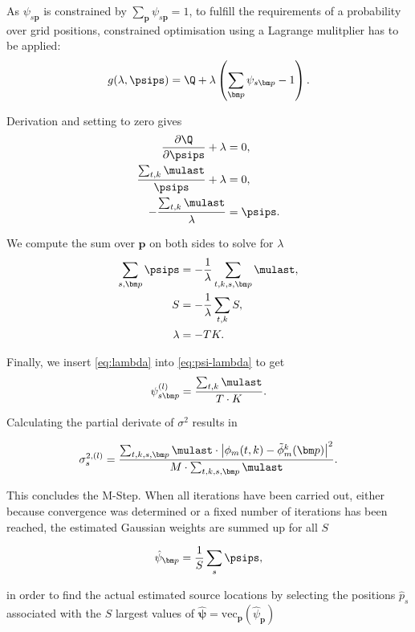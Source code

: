 As $\psi_{s\bm p}$ is constrained by $\sum_{\bm p}\psi_{s\bm p}=1$, to fulfill the requirements of a probability over grid positions, constrained optimisation using a Lagrange mulitplier has to be applied:
\begin{equation}
    g(\lambda,\psips)=\Q+\lambda\left (\sum_{\bm p}\psi_{s\bm p}-1\right ).
\end{equation}

Derivation and setting to zero gives
\begin{align}
    \frac{\partial\Q}{\partial\psips}+\lambda &=0,\\
    \frac{\sum_{t,k}\mulast}{\psips}+\lambda &=0,\\
    -\frac{\sum_{t,k}\mulast}{\lambda}&=\psips
\label{eq:psi-lambda}.
\end{align}

We compute the sum over $\bm p$ on both sides to solve for $\lambda$
\begin{align}
    \sum_{s,\bm p}\psips &=-\frac{1}{\lambda}\sum_{t,k,s,\bm p}\mulast,\\
    S&=-\frac{1}{\lambda}\sum_{t,k}S,\\
    \lambda &= -TK.\label{eq:lambda}
\end{align}

Finally, we insert \eqref{eq:lambda} into \eqref{eq:psi-lambda} to get
\begin{equation}\label{eq:m_step_psi}
    \psi_{s\bm p}^{(l)}=\frac{\sum_{t,k}\mulast}{T\cdot K}.
\end{equation}

Calculating the partial derivate of $\sigma^2$ results in

\begin{equation}\label{eq:m_step_var}
    \sigma_s^{2,(l)}=\frac{\sum_{t,k,s,\bm p}\mulast\cdot\left | \phi_m(t,k)-\tilde\phi_m^k(\bm p)\right |^2}{M\cdot \sum_{t,k,s,\bm p}\mulast}.
\end{equation}

This concludes the M-Step. When all iterations have been carried out, either because convergence was determined or a fixed number of iterations has been reached, the estimated Gaussian weights are summed up for all $S$

\begin{equation}
    \hat\psi_{\bm p} = \frac{1}{S}\sum_{s}\psips,
\end{equation}

in order to find the actual estimated source locations by selecting the positions $\hat p_s$ associated with the $S$ largest values of $\hat{\bm\psi} = \text{vec}_{\bm p}(\hat\psi_{\bm p})$

